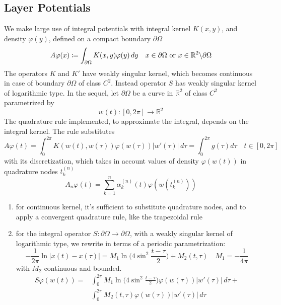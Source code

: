 \documentclass[10pt, a4paper, twoside, openright]{book}
\theoremstyle{definition}
\theoremstyle{plain}
\theoremstyle{plain}
\theoremstyle{plain}
\theoremstyle{plain}
\theoremstyle{plain}
\theoremstyle{plain}
\theoremstyle{plain}
\theoremstyle{plain}
\let\phi\varphi
\begin{document}
\subsection{Layer Potentials}
We make large use of integral potentials with integral kernel $K(x,y)$, and density $\phi(y)$, defined on a compact boundary $\partial \Omega$
\begin{equation}
 A\phi(x)\coloneqq \int_{\partial \Omega} K(x,y)\phi(y)\,dy \quad x\in \partial \Omega \textup{ or }x\in\mathbb{R}^2\backslash\partial\Omega
\end{equation}
The operators $K$ and $K'$ have weakly singular kernel, which becomes continuous in case of boundary $\partial \Omega$ of class $C^2$. Instead operator $S$ has weakly singular kernel of logarithmic type.
In the sequel, let $\partial\Omega$ be a curve in $\mathbb{R}^2$ of class $C^2$ parametrized by
\begin{equation}
w(t):[0,2\pi]\to\mathbb{R}^2
\end{equation}
The quadrature rule implemented, to approximate the integral, depends on the integral kernel. The rule substitutes 
\begin{equation}
 A\phi(t)=\int_0^{2\pi} K(w(t),w(\tau))\phi(w(\tau))|w'(\tau)|\,d\tau=\int_0^{2\pi}g(\tau)d\tau \quad t\in[0,2\pi]
\end{equation}
with its discretization, which takes in account values of density $\phi(w(t))$ in quadrature nodes $t_k^{(n)}$
\begin{equation}
 A_n\phi(t) = \sum_{k=1}^n\alpha_k^{(n)}(t)\phi(w(t_k^{(n)}))
\end{equation}
\begin{enumerate}
 \item for continuous kernel, it's sufficient to substitute quadrature nodes, and to apply a convergent quadrature rule, like the trapezoidal rule
 \item for the integral operator $S:\partial\Omega\to \partial\Omega$, with a weakly singular kernel of logarithmic type, we rewrite in terms of a periodic parametrization:
\begin{equation}
 -\frac{1}{2\pi}\ln|x(t)-x(\tau)|=M_1\ln\Big(4\sin^2\frac{t-\tau}{2}\Big)+M_2(t,\tau) \quad M_1 = -\frac{1}{4\pi}
\end{equation}
with $M_2$ continuous and bounded.
\begin{align}
 S\phi(w(t)) =  &\int_0^{2\pi} M_1\ln\Big(4\sin^2\frac{t-\tau}{2}\Big)\phi(w(\tau))|w'(\tau)|\,d\tau + \\ 
                &\int_0^{2\pi} M_2(t,\tau)\phi(w(\tau))|w'(\tau)|\,d\tau 
\end{align}

\end{enumerate}
\end{document}
